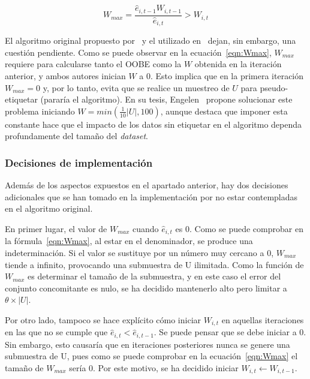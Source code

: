\begin{equation}\label{eqn:Wmax} W_{max} = \frac{\hat{e}_{i,t-1}W_{i,t-1}}{\hat{e}_{i, t}} > W_{i,t} \end{equation}


\label{parag:Wmax_inicial} El algoritmo original propuesto por~\cite{originalCoForest2007} y el utilizado en~\cite{zhou2021SemisupervisedRecommendationAttack} dejan, sin embargo, una cuestión pendiente. Como se puede observar en la ecuación~\ref{eqn:Wmax}, $W_{max}$ requiere para calcularse tanto el OOBE como la $W$ obtenida en la iteración anterior, y ambos autores inician $W$ a 0. Esto implica que en la primera iteración $W_{max} = 0$ y, por lo tanto, evita que se realice un muestreo de $U$ para pseudo-etiquetar (pararía el algoritmo). En su tesis, Engelen~\cite{engelen2018thesis} propone solucionar este problema iniciando $W = min(\frac{1}{10}|U|, 100)$, aunque destaca que imponer esta constante hace que el impacto de los datos sin etiquetar en el algoritmo dependa profundamente del tamaño del \textit{dataset}.


\subsubsection{Decisiones de implementación}

Además de los aspectos expuestos en el apartado anterior, hay dos decisiones adicionales que se han tomado en la implementación por no estar contempladas en el algoritmo original.

En primer lugar, el valor de $W_{max}$ cuando $\hat{e}_{i, t}$  es $0$. Como se puede comprobar en la fórmula~\ref{eqn:Wmax}, al estar en el denominador, se produce una indeterminación. Si el valor se sustituye por un número muy cercano a 0, $W_{max}$ tiende a infinito, provocando una submuestra de U ilimitada. Como la función de $W_{max}$ es determinar el tamaño de la submuestra, y en este caso el error del conjunto concomitante es nulo, se ha decidido mantenerlo alto pero limitar a $\theta\times|U|$.

Por otro lado, tampoco se hace explícito cómo iniciar $W_{i,t}$ en aquellas iteraciones en las que no se cumple que $\hat{e}_{i,t} < \hat{e}_{i,t-1}$. Se puede pensar que se debe iniciar a 0. Sin embargo, esto causaría que en iteraciones posteriores nunca se genere una submuestra de U, pues como se puede comprobar en la ecuación~\ref{eqn:Wmax} el tamaño de $W_{max}$ sería $0$. Por este motivo, se ha decidido iniciar $W_{i,t} \leftarrow W_{i,t-1}$.


